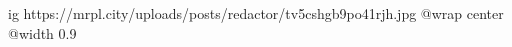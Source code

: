  
 
 
 
 

\ifcmt
  ig https://mrpl.city/uploads/posts/redactor/tv5cshgb9po41rjh.jpg
  @wrap center
  @width 0.9
\fi
